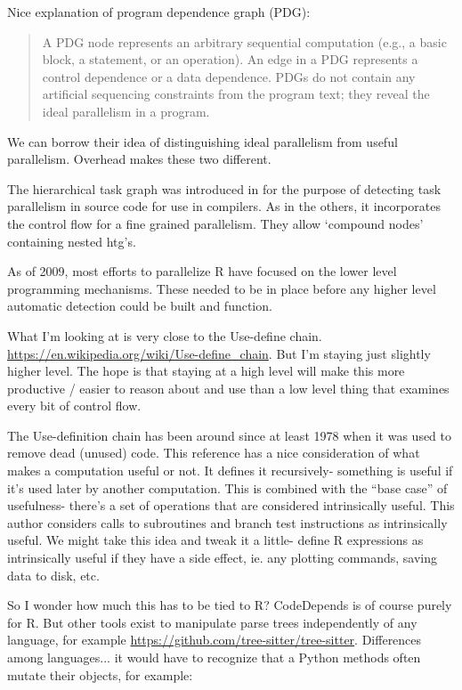 \documentclass[12pt]{article}
\begin{document}
Nice explanation of program dependence graph (PDG):

\begin{quote}
    A PDG node represents
    an arbitrary sequential computation (e.g., a basic block, a
    statement, or an operation). An edge in a PDG represents
    a control dependence or a data dependence. PDGs do not
    contain any artificial sequencing constraints from the
    program text; they reveal the ideal parallelism in a
    program. \cite{sarkar1991automatic} 
\end{quote}

We can borrow their idea of distinguishing ideal parallelism from useful
parallelism. Overhead makes these two different.

The hierarchical task graph was introduced in \cite{girkar1992automatic}
for the purpose of detecting task parallelism in source code for use in compilers.
As in the others, it incorporates the control flow for a fine grained
parallelism. They allow `compound nodes' containing nested htg's.

As of 2009, most efforts to parallelize R have focused on the lower level
programming mechanisms. These needed to be in place before any higher level
automatic detection could be built and function.
\cite{schmidberger2009state} 

What I'm looking at is very close to the Use-define chain.
\url{https://en.wikipedia.org/wiki/Use-define_chain}. But I'm staying just
slightly higher level. The hope is that staying at a high level will make
this more productive / easier to reason about and use than a low level
thing that examines every bit of control flow.

The Use-definition chain has been around since at least 1978
when it was used to remove dead (unused) code\cite{kennedy1978use}. This
reference has a nice consideration of what makes a computation useful or
not. It defines it recursively- something is useful if it's used later by another
computation. This is combined with the ``base case'' of usefulness- there's
a set of operations that are considered intrinsically useful. This author
considers calls to subroutines and branch test instructions as
intrinsically useful. We might take this idea and tweak it a little- define
R expressions as intrinsically useful if they have a side effect, ie. any
plotting commands, saving data to disk, etc.

So I wonder how much this has to be tied to R? CodeDepends is of course
purely for R. But other tools exist to manipulate parse trees independently
of any language, for example
\url{https://github.com/tree-sitter/tree-sitter}. Differences among
languages... it would have to recognize that a Python methods often mutate
their objects, for example:
\end{document}
